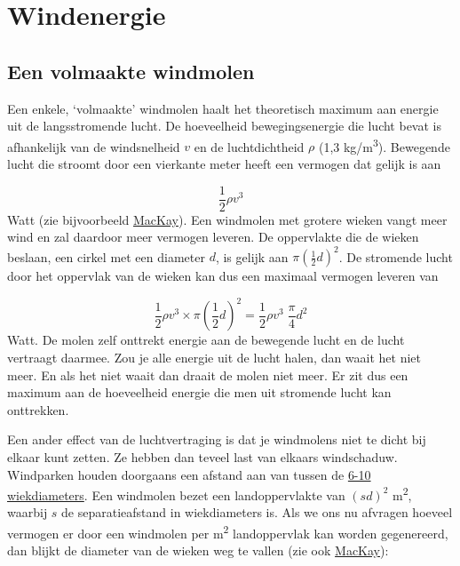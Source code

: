 \documentclass[
  11pt,
  a4paper,
]{book}
\begin{document}
\hypertarget{appendix-appendix}{%
\appendix}


\hypertarget{windenergie-1}{%
\chapter{Windenergie}\label{windenergie-1}}

\hypertarget{een-volmaakte-windmolen}{%
\section{Een volmaakte windmolen}\label{een-volmaakte-windmolen}}

\bigskip

Een enkele, `volmaakte' windmolen haalt het theoretisch maximum aan energie uit de langsstromende lucht. De hoeveelheid bewegingsenergie die lucht bevat is afhankelijk van de windsnelheid \(v\) en de luchtdichtheid \(\rho\) (1,3 kg/m\textsuperscript{3}). Bewegende lucht die stroomt door een vierkante meter heeft een vermogen dat gelijk is aan

\[ \frac{1}{2} \rho v^3 \]
\noindent
Watt (zie bijvoorbeeld \href{https://www.withouthotair.com/download.html}{MacKay}). Een windmolen met grotere wieken vangt meer wind en zal daardoor meer vermogen leveren. De oppervlakte die de wieken beslaan, een cirkel met een diameter \(d\), is gelijk aan \(\pi (\frac{1}{2} d)^2\). De stromende lucht door het oppervlak van de wieken kan dus een maximaal vermogen leveren van

\[ \frac{1}{2} \rho v^3 \times \pi  (\frac{1}{2} d)^2 = \frac{1}{2} \rho v^3 \; \frac{\pi}{4} d^2\]
\noindent
Watt. De molen zelf onttrekt energie aan de bewegende lucht en de lucht vertraagt daarmee. Zou je alle energie uit de lucht halen, dan waait het niet meer. En als het niet waait dan draait de molen niet meer. Er zit dus een maximum aan de hoeveelheid energie die men uit stromende lucht kan onttrekken.

\medskip

Een ander effect van de luchtvertraging is dat je windmolens niet te dicht bij elkaar kunt zetten. Ze hebben dan teveel last van elkaars windschaduw. Windparken houden doorgaans een afstand aan van tussen de \href{https://en.wikipedia.org/wiki/Wind_turbine\#Wind_turbine_spacing}{6-10 wiekdiameters}. Een windmolen bezet een landoppervlakte van \((sd)^2\) m\textsuperscript{2}, waarbij \(s\) de separatieafstand in wiekdiameters is. Als we ons nu afvragen hoeveel vermogen er door een windmolen per m\textsuperscript{2} landoppervlak kan worden gegenereerd, dan blijkt de diameter van de wieken weg te vallen (zie ook \href{https://www.withouthotair.com/download.html}{MacKay}):
\end{document}
